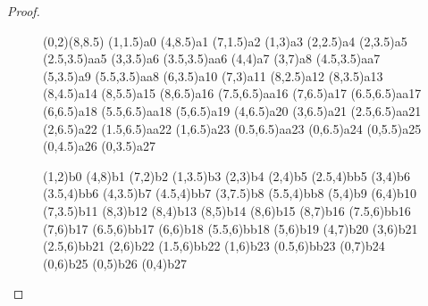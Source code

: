 \begin{proof}
\makeatletter{}\begin{figure}[h]
\begin{center}
 \pspicture(0,2)(8,8.5)
  \dotnode(1,1.5){a0}
 \dotnode(4,8.5){a1}
 \dotnode(7,1.5){a2}
  \dotnode[linewidth=1.5pt,linecolor=gray](1,3){a3}
 \dotnode(2,2.5){a4}
 \dotnode(2,3.5){a5}
 \dotnode(2.5,3.5){aa5}
 \dotnode(3,3.5){a6}
 \dotnode(3.5,3.5){aa6}
 \dotnode(4,4){a7}
 \dotnode(3,7){a8}
 \dotnode(4.5,3.5){aa7}
 \dotnode(5,3.5){a9}
 \dotnode(5.5,3.5){aa8}
 \dotnode(6,3.5){a10}
 \dotnode[linewidth=1.5pt,linecolor=gray](7,3){a11}
 \dotnode(8,2.5){a12}
 \dotnode(8,3.5){a13}
 \dotnode(8,4.5){a14}
 \dotnode(8,5.5){a15}
 \dotnode(8,6.5){a16}
 \dotnode(7.5,6.5){aa16}
 \dotnode(7,6.5){a17}
 \dotnode(6.5,6.5){aa17}
 \dotnode(6,6.5){a18}
 \dotnode(5.5,6.5){aa18}
 \dotnode(5,6.5){a19}
 \dotnode[linewidth=1.5pt,linecolor=black,dotstyle=o](4,6.5){a20}
 \dotnode(3,6.5){a21}
 \dotnode(2.5,6.5){aa21}
 \dotnode(2,6.5){a22}
 \dotnode(1.5,6.5){aa22}
 \dotnode(1,6.5){a23}
 \dotnode(0.5,6.5){aa23}
 \dotnode(0,6.5){a24}
 \dotnode(0,5.5){a25}
 \dotnode(0,4.5){a26}
 \dotnode(0,3.5){a27}

 \dotnode(1,2){b0}
 \dotnode(4,8){b1}
 \dotnode(7,2){b2}
 \dotnode[linewidth=1.5pt,linecolor=black,dotstyle=o](1,3.5){b3}
 \dotnode(2,3){b4}
 \dotnode(2,4){b5}
 \dotnode(2.5,4){bb5}
 \dotnode(3,4){b6}
 \dotnode(3.5,4){bb6}
 \dotnode(4,3.5){b7}
 \dotnode(4.5,4){bb7}
 \dotnode(3,7.5){b8}
 \dotnode(5.5,4){bb8}
 \dotnode(5,4){b9}
 \dotnode(6,4){b10}
 \dotnode[linewidth=1.5pt,linecolor=black,dotstyle=o](7,3.5){b11}
 \dotnode(8,3){b12}
 \dotnode(8,4){b13}
 \dotnode(8,5){b14}
 \dotnode(8,6){b15}
 \dotnode(8,7){b16}
 \dotnode(7.5,6){bb16}
 \dotnode(7,6){b17}
 \dotnode(6.5,6){bb17}
 \dotnode(6,6){b18}
 \dotnode(5.5,6){bb18}
 \dotnode(5,6){b19}
 \dotnode[linewidth=1.5pt,linecolor=gray](4,7){b20}
 \dotnode(3,6){b21}
 \dotnode(2.5,6){bb21}
 \dotnode(2,6){b22}
 \dotnode(1.5,6){bb22}
 \dotnode(1,6){b23}
 \dotnode(0.5,6){bb23}
 \dotnode(0,7){b24}
 \dotnode(0,6){b25}
 \dotnode(0,5){b26}
 \dotnode(0,4){b27}




\end{center}
\end{figure}
\end{proof}
